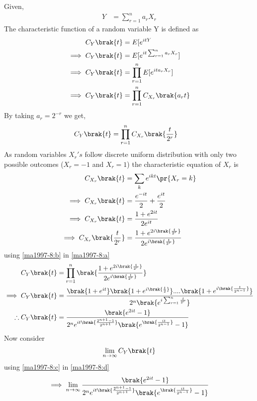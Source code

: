 

   

Given,
\begin{align}
    Y&=\sum_{r=1}^{n}a_rX_r
\end{align}
The characteristic function of a random variable Y is defined as
\begin{align}
    C_{Y}\brak{t}&=E[e^{itY}\\
    \implies C_{Y}\brak{t}&=E[e^{it\sum_{r=1}^{n}a_rX_r}]\\
    \implies C_{Y}\brak{t}&=\prod_{r=1}^{n}E[e^{ita_rX_r}]\\
    \implies C_{Y}\brak{t}&=\prod_{r=1}^{n}C_{X_r}\brak{a_rt}
\end{align}
By taking $a_r=2^{-r}$ we get,
\begin{align}
    C_{Y}\brak{t}&=\prod_{r=1}^{n}C_{X_r}\brak{\frac{t}{2^r}}
    \label{ma1997-8:a}
\end{align}
As random variables $X_r's$ follow discrete uniform distribution with only two possible outcomes ($X_r=-1$ and $X_r=1$) the characteristic equation of $X_r$ is
\begin{align}
    C_{X_r}\brak{t}&=\sum_{k}e^{ikt}\pr{X_r=k}\\
    \implies C_{X_r}\brak{t}&=\frac{e^{-it}}{2}+\frac{e^{it}}{2}\\
    \implies C_{X_r}\brak{t}&=\frac{1+e^{2it}}{2e^{it}}\\
    \implies C_{X_r}\brak{\frac{t}{2^r}}&=\frac{1+e^{2i\brak{\frac{t}{2^r}}}}{2e^{i\brak{\frac{t}{2^r}}}}
        \label{ma1997-8:b}
\end{align}
using \eqref{ma1997-8:b} in \eqref{ma1997-8:a}
\begin{align}
    C_{Y}\brak{t}&=\prod_{r=1}^{n}\brak{\frac{1+e^{2i\brak{\frac{t}{2^r}}}}{2e^{i\brak{\frac{t}{2^r}}}}}\\
    \implies C_{Y}\brak{t}&=\frac{\brak{1+e^{it}}\brak{1+e^{i\brak{\frac{t}{2}}}}....\brak{1+e^{i\brak{\frac{t}{2^{n-1}}}}}}{2^n\brak{e^{i\sum_{r=1}^n\frac{t}{2^r}}}}\\
     \therefore C_{Y}\brak{t}&=\frac{\brak{e^{2it}-1}}{2^ne^{it\brak{\frac{2^{n+1}-1}{2^{n+1}}}}\brak{e^{\brak{\frac{it}{2^{n-1}}}}-1}}
     \label{ma1997-8:c}
\end{align}
Now consider
\begin{align}
     \lim_{n\to\infty} C_{Y}\brak{t}
     \label{ma1997-8:d}
\end{align}
using \eqref{ma1997-8:c} in \eqref{ma1997-8:d}
\begin{align}
    \implies \lim_{n\to\infty}\frac{\brak{e^{2it}-1}}{2^ne^{it\brak{\frac{2^{n+1}-1}{2^{n+1}}}}\brak{e^{\brak{\frac{it}{2^{n-1}}}}-1}}
    \label{ma1997-8:e}
\end{align}
